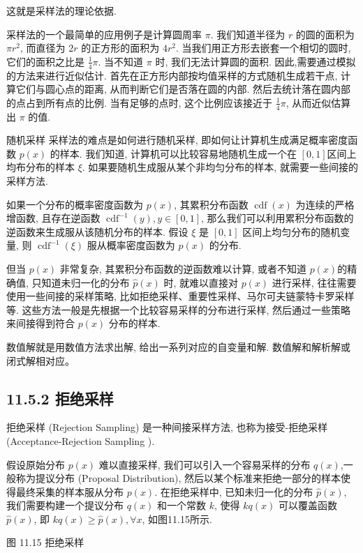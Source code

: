 \documentclass[10pt]{article}
\begin{document}
这就是采样法的理论依据.

采样法的一个最简单的应用例子是计算圆周率 $\pi$. 我们知道半径为 $r$ 的圆的面积为 $\pi r^{2}$, 而直径为 $2 r$ 的正方形的面积为 $4 r^{2}$. 当我们用正方形去嵌套一个相切的圆时, 它们的面积之比是 $\frac{1}{4} \pi$. 当不知道 $\pi$ 时, 我们无法计算圆的面积. 因此,需要通过模拟的方法来进行近似估计. 首先在正方形内部按均值采样的方式随机生成若干点, 计算它们与圆心点的距离, 从而判断它们是否落在圆的内部. 然后去统计落在圆内部的点占到所有点的比例. 当有足够的点时, 这个比例应该接近于 $\frac{1}{4} \pi$, 从而近似估算出 $\pi$ 的值.

随机采样 采样法的难点是如何进行随机采样, 即如何让计算机生成满足概率密度函数 $p(x)$ 的样本. 我们知道, 计算机可以比较容易地随机生成一个在 $[0,1]$区间上均布分布的样本 $\xi$. 如果要随机生成服从某个非均匀分布的样本, 就需要一些间接的采样方法.

如果一个分布的概率密度函数为 $p(x)$, 其累积分布函数 $\operatorname{cdf}(x)$ 为连续的严格增函数, 且存在逆函数 $\operatorname{cdf}^{-1}(y), y \in[0,1]$, 那么我们可以利用累积分布函数的逆函数来生成服从该随机分布的样本. 假设 $\xi$ 是 $[0,1]$ 区间上均匀分布的随机变量, 则 $\operatorname{cdf}^{-1}(\xi)$ 服从概率密度函数为 $p(x)$ 的分布.

但当 $p(x)$ 非常复杂, 其累积分布函数的逆函数难以计算, 或者不知道 $p(x)$的精确值, 只知道未归一化的分布 $\hat{p}(x)$ 时, 就难以直接对 $p(x)$ 进行采样, 往往需要使用一些间接的采样策略, 比如拒绝采样、重要性采样、马尔可夫链蒙特卡罗采样等. 这些方法一般是先根据一个比较容易采样的分布进行采样, 然后通过一些策略来间接得到符合 $p(x)$ 分布的样本.

数值解就是用数值方法求出解, 给出一系列对应的自变量和解. 数值解和解析解或闭式解相对应。

\subsection*{11.5.2 拒绝采样}
拒绝采样 (Rejection Sampling) 是一种间接采样方法, 也称为接受-拒绝采样 (Acceptance-Rejection Sampling ).

假设原始分布 $p(x)$ 难以直接采样, 我们可以引入一个容易采样的分布 $q(x)$,一般称为提议分布 (Proposal Distribution), 然后以某个标准来拒绝一部分的样本使得最终采集的样本服从分布 $p(x)$. 在拒绝采样中, 已知未归一化的分布 $\hat{p}(x)$, 我们需要构建一个提议分布 $q(x)$ 和一个常数 $k$, 使得 $k q(x)$ 可以覆盖函数 $\hat{p}(x)$, 即 $k q(x) \geq \hat{p}(x), \forall x$, 如图11.15所示.



图 11.15 拒绝采样
\end{document}
